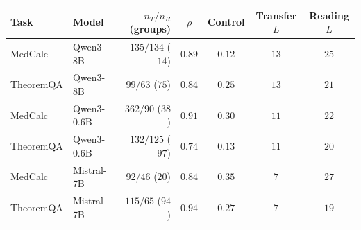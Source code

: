 \begin{tabular}{@{}llrcccc@{}}
\toprule
\rowcolor{TableHeader}
\textbf{Task} & \textbf{Model} & $n_T/n_R$ (groups) & $\rho$  & \textbf{Control} & \textbf{Transfer} $L$ & \textbf{Reading} $L$ \\
\midrule
MedCalc & Qwen3-8B & $135/134$ ($14$) & $0.89$ & $0.12$ & $13$ & $25$ \\
TheoremQA & Qwen3-8B & $99/63$ ($75$) & $0.84$ & $0.25$ & $13$ & $21$ \\
\midrule
MedCalc & Qwen3-0.6B & $362/90$ ($38$) & $0.91$ & $0.30$ & $11$ & $22$ \\
TheoremQA & Qwen3-0.6B & $132/125$ ($97$) & $0.74$ & $0.13$ & $11$ & $20$ \\
\midrule
MedCalc & Mistral-7B & $92/46$ ($20$) & $0.84$ & $0.35$ & $7$ & $27$ \\
TheoremQA & Mistral-7B & $115/65$ ($94$) & $0.94$ & $0.27$ & $7$ & $19$ \\
\bottomrule
\end{tabular}
